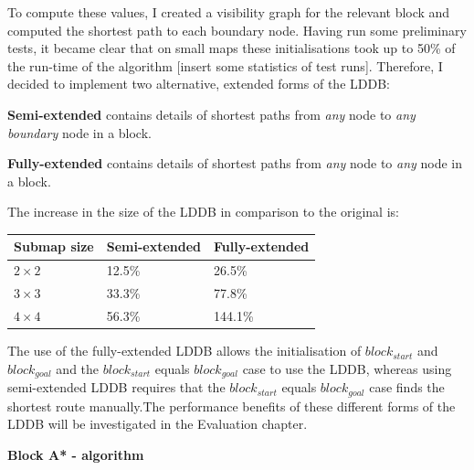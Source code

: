 \documentclass[12pt,twoside,notitlepage]{report}
\begin{document}
\noindent
To compute these values, I created a visibility graph for the relevant block and computed the shortest path to each boundary node. Having run some preliminary tests, it became clear that on small maps these initialisations took up to 50\% of the run-time of the algorithm [insert some statistics of test runs]. Therefore, I decided to implement two alternative, extended forms of the LDDB:
\begin{description}
\item{\bf Semi-extended} contains details of shortest paths from {\em any} node to {\em any boundary} node in a block.
\item{\bf Fully-extended} contains details of shortest paths from {\em any} node to {\em any} node in a block.
\end{description}

\noindent
The increase in the size of the LDDB in comparison to the original is:
\begin{center}
    \begin{tabular}{| l | l | l |}
    \hline
    Submap size & Semi-extended & Fully-extended  \\ \hline
    {$2 \times 2$}  & 12.5\% & 26.5\% \\ \hline
    {$3 \times 3$}  & 33.3\% & 77.8\%\\ \hline
    {$4 \times 4$}  & 56.3\% & 144.1\% \\ \hline
  \end{tabular}
\end{center}

\noindent
The use of the fully-extended LDDB allows the initialisation of $block_{start}$ and $block_{goal}$ and the $block_{start}$ equals $block_{goal}$ case to use the LDDB, whereas using semi-extended LDDB requires that the $block_{start}$ equals $block_{goal}$ case finds the shortest route manually.\footnotemark[1] The performance benefits of these different forms of the LDDB will be investigated in the Evaluation chapter.\\


\noindent
{\bf Block A* - algorithm} \\
\end{document}
